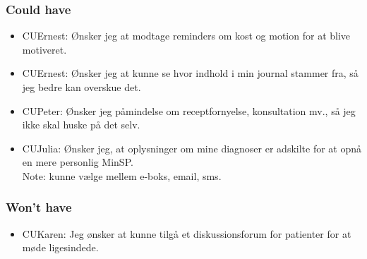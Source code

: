 \subsubsection*{Could have}
\begin{itemize}
\item CUErnest: Ønsker jeg at modtage reminders om kost og motion for at blive motiveret.
\item CUErnest: Ønsker jeg at kunne se hvor indhold i min journal stammer fra, så jeg bedre kan overskue det.
\item CUPeter: Ønsker jeg påmindelse om receptfornyelse, konsultation mv., så jeg ikke skal huske på det selv.
\item CUJulia: Ønsker jeg, at oplysninger om mine diagnoser er adskilte for at opnå en mere personlig MinSP.\\
Note: kunne vælge mellem e-boks, email, sms.
\end{itemize}
\subsubsection*{Won't have}
\begin{itemize}
\item CUKaren: Jeg ønsker at kunne tilgå et diskussionsforum for patienter for at møde ligesindede.
\end{itemize}
